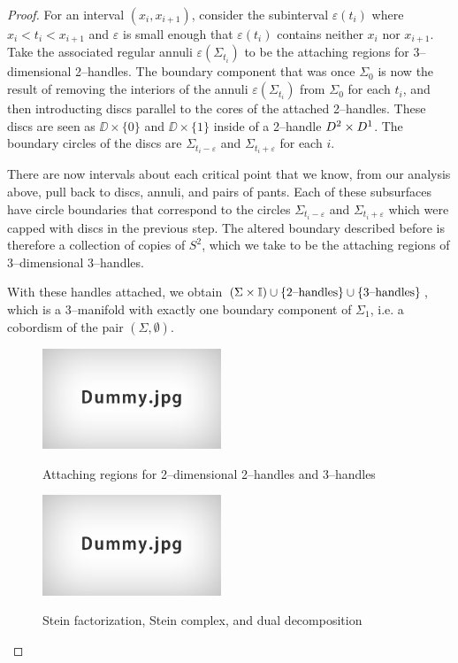 \begin{proof}
	For an interval $(x_i,x_{i+1})$, consider the subinterval $\varepsilon(t_i)$ where $x_i<t_i<x_{i+1}$ and $\varepsilon$ is small enough that $\varepsilon(t_i)$ contains neither $x_i$ nor $x_{i+1}$.
	Take the associated regular annuli $\varepsilon(\Sigma_{t_i})$ to be the attaching regions for 3--dimensional 2--handles.
	The boundary component that was once $\Sigma_0$ is now the result of removing the interiors of the annuli $\varepsilon(\Sigma_{t_i})$ from $\Sigma_0$ for each $t_i$, and then introducting discs parallel to the cores of the attached 2--handles.
	These discs are seen as $\DD\times\{0\}$ and $\DD\times\{1\}$ inside of a 2--handle $D^2\times D^1$.
	The boundary circles of the discs are $\Sigma_{t_i-\varepsilon}$ and $\Sigma_{t_i+\varepsilon}$ for each $i$.
	
	There are now intervals about each critical point that we know, from our analysis above, pull back to discs, annuli, and pairs of pants.
	Each of these subsurfaces have circle boundaries that correspond to the circles $\Sigma_{t_i-\varepsilon}$ and $\Sigma_{t_i+\varepsilon}$ which were capped with discs in the previous step.
	The altered boundary described before is therefore a collection of copies of $S^2$, which we take to be the attaching regions of 3--dimensional 3--handles.
	
	With these handles attached, we obtain $(\Sigma\times\mathbb{I})\cup\{\textrm{2--handles}\}\cup\{\textrm{3--handles}\}$, which is a 3--manifold with exactly one boundary component of $\Sigma_1$, i.e. a cobordism of the pair $(\Sigma,\emptyset)$.
	
	\begin{figure}
		\centering
		\caption{Attaching regions for 2--dimensional 2--handles and 3--handles}
		\includegraphics[height=3cm]{figures/dummy.jpg}
		\label{fig:2dim2handle3handle}
	\end{figure}
	
	\begin{figure}
		\centering
		\caption{Stein factorization, Stein complex, and dual decomposition}
		\includegraphics[height=3cm]{figures/dummy.jpg}
		\label{fig:2dimsteindual}
	\end{figure}
	

\end{proof}

